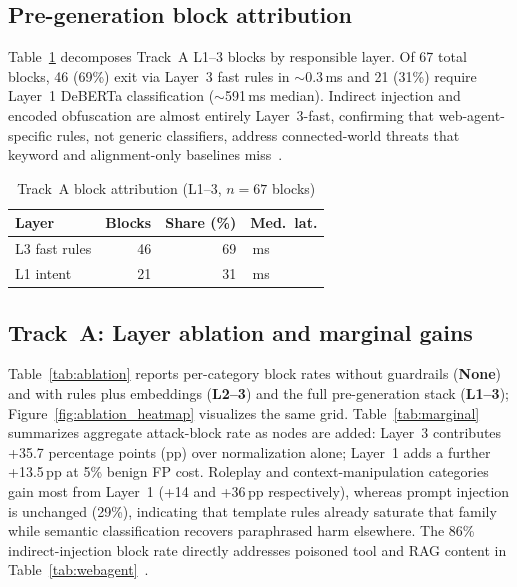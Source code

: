\documentclass[conference]{IEEEtran}
\newcommand{\tablestretch}{1.18}
\newcommand{\tablesetup}{\small\renewcommand{\arraystretch}{\tablestretch}\setlength{\tabcolsep}{4pt}}
\begin{document}
\subsection{Pre-generation block attribution}
\label{sec:attribution}

Table~\ref{tab:attribution} decomposes Track~A L1--3 blocks by responsible layer.
Of 67 total blocks, 46 (69\%) exit via Layer~3 fast rules in ${\sim}$0.3\,ms and
21 (31\%) require Layer~1 DeBERTa classification (${\sim}$591\,ms median).
Indirect injection and encoded obfuscation are almost entirely Layer~3-fast,
confirming that web-agent-specific rules, not generic classifiers, address
connected-world threats that keyword and alignment-only baselines
miss~\cite{greshake2023not,chu2024comprehensive}.

\begin{table}[t]
\centering
\tablesetup
\caption{Track~A block attribution (L1--3, $n{=}67$ blocks)}
\label{tab:attribution}
\begin{tabularx}{\columnwidth}{@{}>{\raggedright\arraybackslash}X r r >{\raggedleft\arraybackslash}p{}@{}}
\toprule
\rowcolor{headerblue!14}
\textbf{Layer} & \textbf{Blocks} & \textbf{Share (\%)} & \textbf{Med.\ lat.} \\
\midrule
L3 fast rules  & 46 & 69 & 0.3\,ms \\
L1 intent      & 21 & 31 & 591\,ms \\
\bottomrule
\end{tabularx}
\end{table}

\subsection{Track~A: Layer ablation and marginal gains}
\label{sec:ablation}

Table~\ref{tab:ablation} reports per-category block rates without guardrails
(\textbf{None}) and with rules plus embeddings (\textbf{L2--3}) and the full
pre-generation stack (\textbf{L1--3}); Figure~\ref{fig:ablation_heatmap} visualizes
the same grid.
Table~\ref{tab:marginal} summarizes aggregate attack-block rate as nodes are
added: Layer~3 contributes +35.7 percentage points (pp) over normalization
alone; Layer~1 adds a further +13.5\,pp at 5\% benign FP cost.
Roleplay and context-manipulation categories gain most from Layer~1 (+14 and
+36\,pp respectively), whereas prompt injection is unchanged (29\%), indicating
that template rules already saturate that family while semantic classification
recovers paraphrased harm elsewhere.
The 86\% indirect-injection block rate directly addresses poisoned tool and RAG
content in Table~\ref{tab:webagent}~\cite{greshake2023not}.
\end{document}
